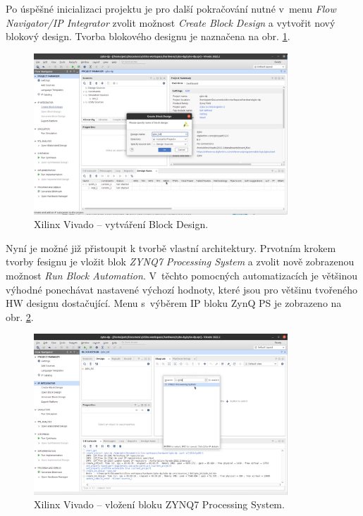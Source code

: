 \documentclass[a4paper, twoside, 11pt]{article}
\begin{document}
\begin{appendices}
		Po úspěšné inicializaci projektu je pro další pokračování nutné v~menu \textit{Flow Navigator/IP Integrator} zvolit možnost \textit{Create Block Design} a vytvořit nový blokový design. Tvorba blokového designu je naznačena na obr. \ref{fig:zybo-xilinx-vivado-flow-05}.
		
		\begin{figure}[htbp!]
			\centering
			\includegraphics[width=0.85\textwidth]{src/png/zybo-xilinx-vivado-flow/zybo-xilinx-vivado-flow-05.jpg}
			\caption{Xilinx Vivado – vytváření Block Design.}
			\label{fig:zybo-xilinx-vivado-flow-05}
		\end{figure}

		Nyní je možné již přistoupit k tvorbě vlastní architektury. Prvotním krokem tvorby fesignu je vložit blok \textit{ZYNQ7 Processing System} a zvolit nově zobrazenou možnost \textit{Run Block Automation}. V~těchto pomocných automatizacích je většinou výhodné ponechávat nastavené výchozí hodnoty, které jsou pro většinu tvořeného HW designu dostačující. Menu s~výběrem IP bloku ZynQ PS je zobrazeno na obr. \ref{fig:zybo-xilinx-vivado-flow-07}.

		\begin{figure}[htbp!]
			\centering
			\includegraphics[width=0.85\textwidth]{src/png/zybo-xilinx-vivado-flow/zybo-xilinx-vivado-flow-07.jpg}
			\caption{Xilinx Vivado – vložení bloku ZYNQ7 Processing System.}
			\label{fig:zybo-xilinx-vivado-flow-07}
		\end{figure}



\end{appendices}
\end{document}
